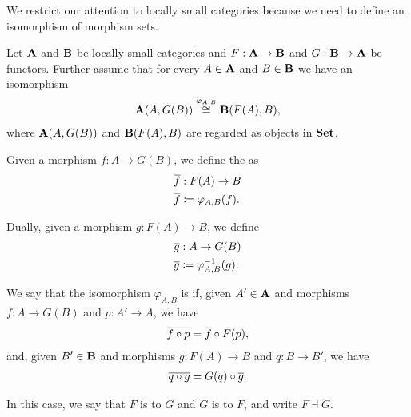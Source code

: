 \begin{note}
  We restrict our attention to locally small categories because we need to define an isomorphism of morphism sets.
\end{note}
\begin{definition}\label{def:adjoint_functor}\cite[definition 2.1.1]{Leinster2014}
  Let $\operatorname{\mathbf{A}}$ and $\operatorname{\mathbf{B}}$ be locally small categories and $F: \operatorname{\mathbf{A}} \to \operatorname{\mathbf{B}}$ and $G: \operatorname{\mathbf{B}} \to \operatorname{\mathbf{A}}$ be functors. Further assume that for every $A \in \operatorname{\mathbf{A}}$ and $B \in \operatorname{\mathbf{B}}$ we have an isomorphism
  \begin{align*}
    \operatorname{\mathbf{A}}(A, G(B)) \overset {\varphi_{A, B}} {\cong} \operatorname{\mathbf{B}}(F(A), B),
  \end{align*}
  where $\operatorname{\mathbf{A}}(A, G(B))$ and $\operatorname{\mathbf{B}}(F(A), B)$ are regarded as objects in $\operatorname{\mathbf{Set}}$.

  Given a morphism $f: A \to G(B)$, we define the  as
  \begin{align*}
    &\overline{f}: F(A) \to B \\
    &\overline{f} \coloneqq \varphi_{A, B} (f).
  \end{align*}

  Dually, given a morphism $g: F(A) \to B$, we define
  \begin{align*}
    &\overline{g}: A \to G(B) \\
    &\overline{g} \coloneqq \varphi_{A, B}^{-1} (g).
  \end{align*}

  We say that the isomorphism $\varphi_{A, B}$ is  if,  given $A' \in \operatorname{\mathbf{A}}$ and morphisms $f: A \to G(B)$ and $p: A' \to A$, we have
  \begin{align*}
    \overline{f \circ p} = \overline{f} \circ F(p),
  \end{align*}
  and, given $B' \in \operatorname{\mathbf{B}}$ and morphisms $g: F(A) \to B$ and $q: B \to B'$, we have
  \begin{align*}
    \overline{q \circ g} = G(q) \circ \overline{g}.
  \end{align*}

  In this case, we say that $F$ is  to $G$ and $G$ is  to $F$, and write $F \dashv G$.
\end{definition}

